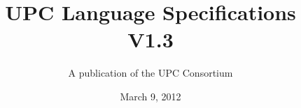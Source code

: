 

\makeindex

\title{UPC Language Specifications\\
V1.3 }

\author{A publication of the UPC Consortium}

\date {March 9, 2012}



\maketitle

\setcounter{page}{2}


\newpage
\setlength {\parskip}{0ex}
\tableofcontents                                             
\setlength {\parskip}{1.3ex}
\newpage












\pagebreak
\printindex

